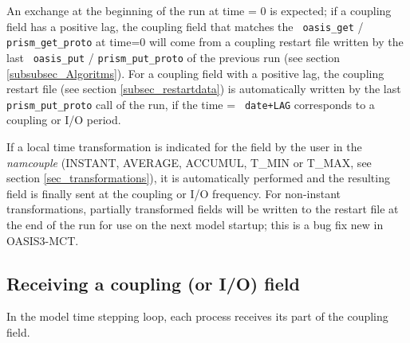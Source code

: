 An exchange at the beginning of the run at time = 0 is expected; if a
coupling field has a positive lag, the coupling field that matches the {\tt
  oasis\_get} / {\tt prism\_get\_proto} at time=0 will come from a
coupling restart file written by the last {\tt
  oasis\_put} / {\tt prism\_put\_proto} of the previous run (see
section \ref{subsubsec_Algoritms}).
For a coupling field with a positive lag, the coupling restart file (see section
\ref{subsec_restartdata}) is automatically written by the
last {\tt prism\_put\_proto} call of the run, if the time = {\tt
  date+LAG}
corresponds to a coupling or I/O period.
 
If a local time transformation is indicated for the field by
the user in the {\it namcouple} (INSTANT, AVERAGE, ACCUMUL, T\_MIN or T\_MAX,
see section \ref{sec_transformations}), it is automatically performed
and the resulting field is finally sent at the coupling or I/O
frequency.  For non-instant transformations, partially transformed
fields will be written to the restart file at the end of the run
for use on the next model startup; this is a bug fix new in OASIS3-MCT.

\subsection{Receiving a coupling (or I/O) field}

In the model time stepping loop, each process
receives its part of the coupling field. 

